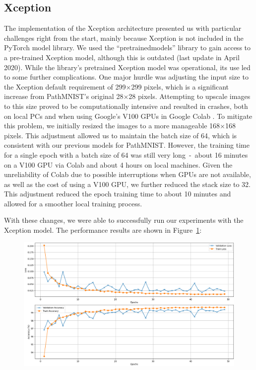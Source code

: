 \subsection{Xception}\label{resultsXceptions}

The implementation of the Xception architecture presented us with particular challenges right from the start, mainly because Xception is not included in the PyTorch model library. We used the ``pretrainedmodels'' library \citep{cadene2023pretrainedmodels} to gain access to a pre-trained Xception model, although this is outdated (last update in April 2020). While the library's pretrained Xception model was operational, its use led to some further complications.
One major hurdle was adjusting the input size to the Xception default requirement of 299$\times$299 pixels, which is a significant increase from PathMNIST's original 28$\times$28 pixels. Attempting to upscale images to this size proved to be computationally intensive and resulted in crashes, both on local PCs and when using Google's V100 GPUs in Google Colab \citep{googlecolab2024}. To mitigate this problem, we initially resized the images to a more manageable 168$\times$168 pixels. This adjustment allowed us to maintain the batch size of 64, which is consistent with our previous models for PathMNIST\@. However, the training time for a single epoch with a batch size of 64 was still very long~-~about 16 minutes on a V100 GPU via Colab and about 4 hours on local machines. Given the unreliability of Colab due to possible interruptions when GPUs are not available, as well as the cost of using a V100 GPU, we further reduced the stack size to 32. This adjustment reduced the epoch training time to about 10 minutes and allowed for a smoother local training process.

With these changes, we were able to successfully run our experiments with the Xception model. The performance results are shown in Figure~\ref{fig:xception_PathMNIST}:

\begin{figure} [ht]
    \centering
    \includegraphics[width=.9\textwidth]{figures/xception_PathMNIST_result.png}
    \caption{}\label{fig:xception_PathMNIST}
\end{figure}